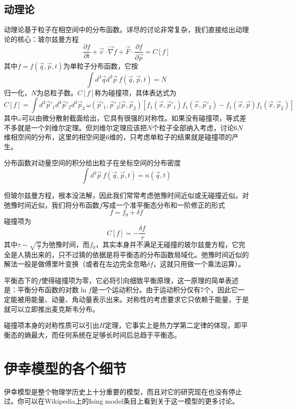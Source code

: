 \documentclass[a4paper,11pt]{ctexart}
\newcommand{\beq}{\begin{equation}}
\newcommand{\eeq}{\end{equation}}
\newcommand{\red}{\color{red}}
\begin{document}
\subsection{动理论}
动理论基于粒子在相空间中的分布函数。详尽的讨论非常复杂，我们直接给出动理论的核心：玻尔兹曼方程
\beq
\frac{\partial f}{\partial t} + \vec{v} \cdot \vec{\nabla} f + \vec{F} \cdot \frac{\partial f}{\partial \vec{p}} = C[f]
\eeq
其中$f = f(\vec{q},\vec{p},t)$为单粒子分布函数，它按
\beq
\int d^3 \vec{q} d^3 \vec{p}\ f(\vec{q},\vec{p},t) = N
\eeq
归一化，$N$为总粒子数。$C[f]$称为碰撞项，具体表达式为
\beq
C[f] = \int d^3 \vec{p}'_1 d^3 \vec{p}'_2 d^3 \vec{p}_2\ \omega(\vec{p}'_1,\vec{p}'_2|\vec{p},\vec{p}_2)[f_1(\vec{x},\vec{p}'_1)f_1(\vec{x},\vec{p}'_2) - f_1(\vec{x},\vec{p})f_1(\vec{x},\vec{p}_2)]
\eeq
其中$\omega$可以由微分散射截面给出，它具有很强的对称性。如果没有碰撞项，等式差不多就是一个刘维尔定理。但刘维尔定理应该把$N$个粒子全部纳入考虑，讨论$6N$维相空间的分布，这里的相空间是6维的，只考虑单粒子的结果就是碰撞项的产生。\par
分布函数对动量空间的积分给出粒子在坐标空间的分布密度
\beq
\int  d^3 \vec{p}\ f(\vec{q},\vec{p},t) = n(\vec{q},t)
\eeq
\par
但玻尔兹曼方程，{\red 根本没法解}，因此我们常常考虑弛豫时间近似或无碰撞近似。对弛豫时间近似，我们将分布函数$f$写成一个准平衡态分布和一阶修正的形式
\beq
f = f_0 + \delta f
\eeq
碰撞项为
\beq
C[f] = - \frac{\delta f}{\tau}
\eeq
其中$\tau \sim \sqrt{\frac{m}{T}}$为弛豫时间，而$f_0$，其实本身并不满足无碰撞的玻尔兹曼方程，它完全是人猜出来的，只不过猜的依据是将平衡态的分布函数局域化。弛豫时间近似的解法一般是做傅里叶变换（或者在左边完全忽略$\delta f$，这就只用做一个乘法运算）。
\par
平衡态下的$f$使得碰撞项为零，它必将引向{\red 细致平衡原理}，这一原理的简单表述是：平衡分布函数的对数$\ln f$是一个运动积分。由于运动积分仅有7个，因此它一定能被用能量、动量、角动量表示出来。对称性的考虑要求它只依赖于能量，于是就可以立即推出麦克斯韦分布。
\par
碰撞项本身的对称性质可以引出$H$定理，它事实上是热力学第二定律的体现，即平衡态的熵最大，而任何系统在足够长时间后总趋于平衡态。



\appendix
\section{伊幸模型的各个细节}
伊幸模型是整个物理学历史上十分重要的模型，而且对它的研究现在也没有停止过。你可以在Wikipedia上的Ising model条目上看到关于这一模型的更多讨论。
\end{document}
